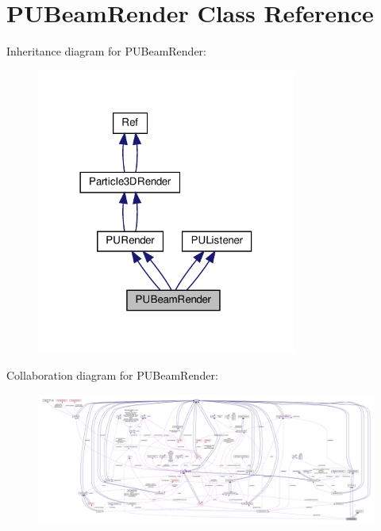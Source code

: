 \hypertarget{classPUBeamRender}{}\section{P\+U\+Beam\+Render Class Reference}
\label{classPUBeamRender}


Inheritance diagram for P\+U\+Beam\+Render\+:
\nopagebreak
\begin{figure}[H]
\begin{center}
\leavevmode
\includegraphics[width=242pt]{classPUBeamRender__inherit__graph}
\end{center}
\end{figure}


Collaboration diagram for P\+U\+Beam\+Render\+:
\nopagebreak
\begin{figure}[H]
\begin{center}
\leavevmode
\includegraphics[width=350pt]{classPUBeamRender__coll__graph}
\end{center}
\end{figure}
